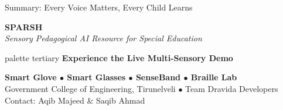 \documentclass[aspectratio=169,10pt]{beamer}
\begin{document}
\begin{frame}{Summary: Every Voice Matters, Every Child Learns}
    \begin{center}
        \vspace{0.4cm}
        {\Huge \textcolor{sparshPurple}{\textbf{SPARSH}}}\\[0.2cm]
        {\Large \textit{Sensory Pedagogical AI Resource for Special Education}}\\[0.6cm]
        
        \begin{beamercolorbox}[sep=8pt,center,rounded=true,shadow=true]{palette tertiary}
            \textbf{\Large Experience the Live Multi-Sensory Demo}
        \end{beamercolorbox}
        
        \vspace{0.4cm}
        \textbf{Smart Glove \quad $\bullet$ \quad Smart Glasses \quad $\bullet$ \quad SenseBand \quad $\bullet$ \quad Braille Lab}\\[0.3cm]
        {\small Government College of Engineering, Tirunelveli $\bullet$ Team Dravida Developers}\\[0.1cm]
        {\footnotesize Contact: Aqib Majeed \& Saqib Ahmad}
    \end{center}
\end{frame}
\end{document}
